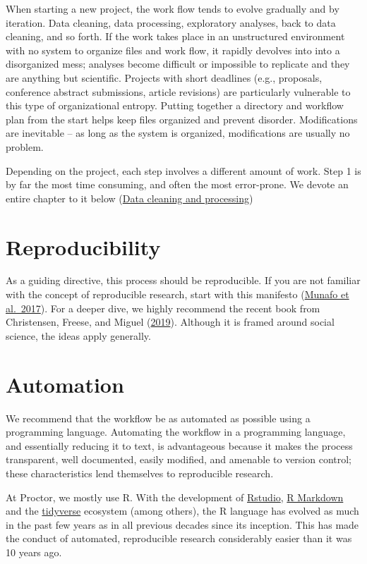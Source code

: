 \documentclass[
]{book}
\begin{document}
When starting a new project, the work flow tends to evolve gradually and by iteration. Data cleaning, data processing, exploratory analyses, back to data cleaning, and so forth. If the work takes place in an unstructured environment with no system to organize files and work flow, it rapidly devolves into into a disorganized mess; analyses become difficult or impossible to replicate and they are anything but scientific. Projects with short deadlines (e.g., proposals, conference abstract submissions, article revisions) are particularly vulnerable to this type of organizational entropy. Putting together a directory and workflow plan from the start helps keep files organized and prevent disorder. Modifications are inevitable -- as long as the system is organized, modifications are usually no problem.

Depending on the project, each step involves a different amount of work. Step 1 is by far the most time consuming, and often the most error-prone. We devote an entire chapter to it below (\hyperref[datacleaning]{Data cleaning and processing})

\section{Reproducibility}\label{reproducibility}

As a guiding directive, this process should be reproducible. If you are not familiar with the concept of reproducible research, start with this manifesto (\href{https://www.nature.com/articles/s41562-016-0021}{Munafo et al.~2017}). For a deeper dive, we highly recommend the recent book from Christensen, Freese, and Miguel (\href{https://www.ucpress.edu/book/9780520296954/transparent-and-reproducible-social-science-research}{2019}). Although it is framed around social science, the ideas apply generally.

\section{Automation}\label{automation}

We recommend that the workflow be as automated as possible using a programming language. Automating the workflow in a programming language, and essentially reducing it to text, is advantageous because it makes the process transparent, well documented, easily modified, and amenable to version control; these characteristics lend themselves to reproducible research.

At Proctor, we mostly use R. With the development of \href{https://rstudio.com/}{Rstudio}, \href{https://rmarkdown.rstudio.com/}{R Markdown} and the \href{https://www.tidyverse.org/}{tidyverse} ecosystem (among others), the R language has evolved as much in the past few years as in all previous decades since its inception. This has made the conduct of automated, reproducible research considerably easier than it was 10 years ago.
\end{document}
